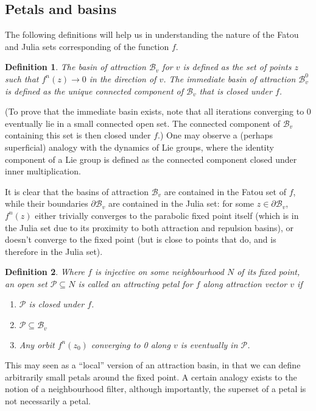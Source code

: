 \documentclass{article}
\newtheorem{dfn}{Definition}
\begin{document}
\subsection{Petals and basins}
The following definitions will help us in understanding the nature of the Fatou and Julia sets corresponding of the function $f$. 
\begin{dfn}
    \label{def:basin}
    The basin of attraction $\mathcal{B}_v$ for $v$ is defined as the set of points $z$ such that $f^n(z)\to 0$ in the direction of $v$. The immediate basin of attraction $\mathcal{B}_v^0$ is defined as the unique connected component of $\mathcal{B}_v$ that is closed under $f$.
\end{dfn}
(To prove that the immediate basin exists, note that all iterations converging to 0 eventually lie in a small connected open set. The connected component of $\mathcal{B}_v$ containing this set is then closed under $f$.) One may observe a (perhaps superficial) analogy with the dynamics of Lie groups, where the identity component of a Lie group is defined as the connected component closed under inner multiplication.

It is clear that the basins of attraction $\mathcal{B}_v$ are contained in the Fatou set of $f$, while their boundaries $\partial\mathcal{B}_v$ are contained in the Julia set: for some $z\in\partial\mathcal{B}_v$, $f^n(z)$ either trivially converges to the parabolic fixed point itself (which is in the Julia set due to its proximity to both attraction and repulsion basins), or doesn't converge to the fixed point (but is close to points that do, and is therefore in the Julia set).

\begin{dfn}
    \label{def:petal}
    Where $f$ is injective on some neighbourhood $N$ of its fixed point, an open set $\mathcal{P} \subseteq N$ is called an attracting petal for $f$ along attraction vector $v$ if 
    \begin{enumerate} 
        \item $\mathcal{P}$ is closed under $f$.
        \item $\mathcal{P}\subseteq\mathcal{B}_v$
        \item Any orbit $f^n(z_0)$ converging to 0 along $v$ is eventually in $\mathcal{P}$. 
    \end{enumerate}
\end{dfn}

This may seen as a ``local'' version of an attraction basin, in that we can define arbitrarily small petals around the fixed point. A certain analogy exists to the notion of a neighbourhood filter, although importantly, the superset of a petal is not necessarily a petal.
\end{document}
